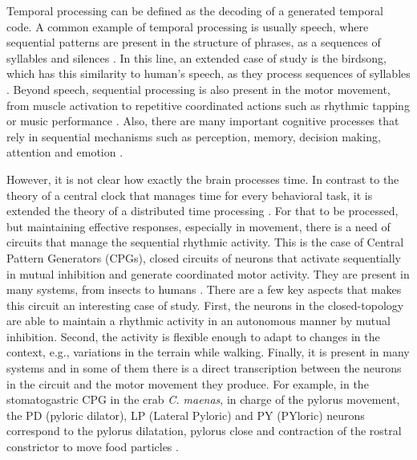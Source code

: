 





Temporal processing can be defined as the decoding of a generated temporal code. A common example of temporal processing is usually speech, where sequential patterns are present in the structure of phrases, as a sequences of syllables and silences \parencite{kiebel_recognizing_2009}. In this line, an extended case of study is the birdsong, which has this similarity to human's speech, as they process sequences of syllables \parencite{prather_brains_2017,fishbein_sound_2019}. Beyond speech, sequential processing is also present in the motor movement, from muscle activation to repetitive coordinated actions such as rhythmic tapping or music performance \parencite{ding_temporal_2017}. Also, there are many important cognitive processes that rely in sequential mechanisms such as perception, memory, decision making, attention and emotion \parencite{michel_eeg_2018, he_robust_2018, rabinovich_sequential_2020}.

However, it is not clear how exactly the brain processes time. In contrast to the theory of a central clock that manages time for every behavioral task, it is extended the theory of a distributed time processing \parencite{buonomano_temporal_1995,ivry_representation_1996}. For that to be processed, but maintaining effective responses, especially in movement, there is a need of circuits that manage the sequential rhythmic activity. This is the case of Central Pattern Generators (CPGs), closed circuits of neurons that activate sequentially in mutual inhibition and generate coordinated motor activity. They are present in many systems, from insects to humans \parencite{pearson_central_1972,marder_central_2001,mackay-lyons_central_2002,minassian_human_2017}. There are a few key aspects that makes this circuit an interesting case of study. First, the neurons in the closed-topology are able to maintain a rhythmic activity in an autonomous manner by mutual inhibition. Second, the activity is flexible enough to adapt to changes in the context, e.g., variations in the terrain while walking. Finally, it is present in many systems and in some of them there is a direct transcription between the neurons in the circuit and the motor movement they produce. For example, in the stomatogastric CPG in the crab \textit{C. maenas}, in charge of the pylorus movement, the PD (pyloric dilator), LP (Lateral Pyloric) and PY (PYloric) neurons correspond to the pylorus dilatation, pylorus close and contraction of the rostral constrictor to move food particles \parencite{selverston_oscillations_2006}.

